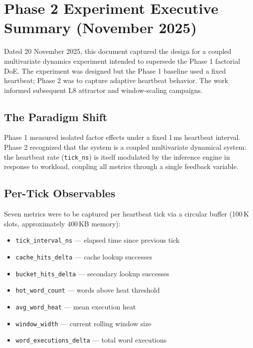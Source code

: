 
\section{Phase 2 Experiment Executive Summary (November 2025)}

Dated 20 November 2025, this document captured the design for a coupled
multivariate dynamics experiment intended to supersede the Phase 1
factorial DoE. The experiment was designed but the Phase 1 baseline used
a fixed heartbeat; Phase 2 was to capture adaptive heartbeat behavior.
The work informed subsequent L8 attractor and window-scaling campaigns.

\subsection{The Paradigm Shift}

Phase 1 measured isolated factor effects under a fixed 1\,ms heartbeat
interval. Phase 2 recognized that the system is a coupled multivariate
dynamical system: the heartbeat rate (\texttt{tick\_ns}) is itself
modulated by the inference engine in response to workload, coupling all
metrics through a single feedback variable.

\subsection{Per-Tick Observables}

Seven metrics were to be captured per heartbeat tick via a circular
buffer (100\,K slots, approximately 400\,KB memory):

\begin{itemize}
  \item \texttt{tick\_interval\_ns} — elapsed time since previous tick
  \item \texttt{cache\_hits\_delta} — cache lookup successes
  \item \texttt{bucket\_hits\_delta} — secondary lookup successes
  \item \texttt{hot\_word\_count} — words above heat threshold
  \item \texttt{avg\_word\_heat} — mean execution heat
  \item \texttt{window\_width} — current rolling window size
  \item \texttt{word\_executions\_delta} — total word executions
\end{itemize}

